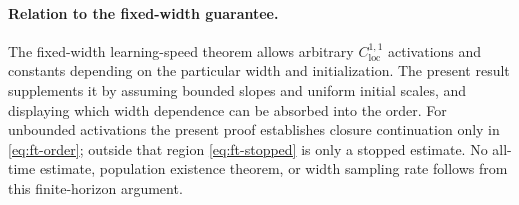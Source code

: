 \paragraph{Relation to the fixed-width guarantee.}
The fixed-width learning-speed theorem allows arbitrary
$C^{1,1}_{\mathrm{loc}}$ activations and constants depending on the
particular width and initialization.  The present result supplements it
by assuming bounded slopes and uniform initial scales, and displaying
which width dependence can be absorbed into the order.  For unbounded
activations the present proof establishes closure continuation only in
\eqref{eq:ft-order}; outside that region
\eqref{eq:ft-stopped} is only a stopped estimate.  No all-time estimate,
population existence theorem, or width sampling rate follows from this
finite-horizon argument.
